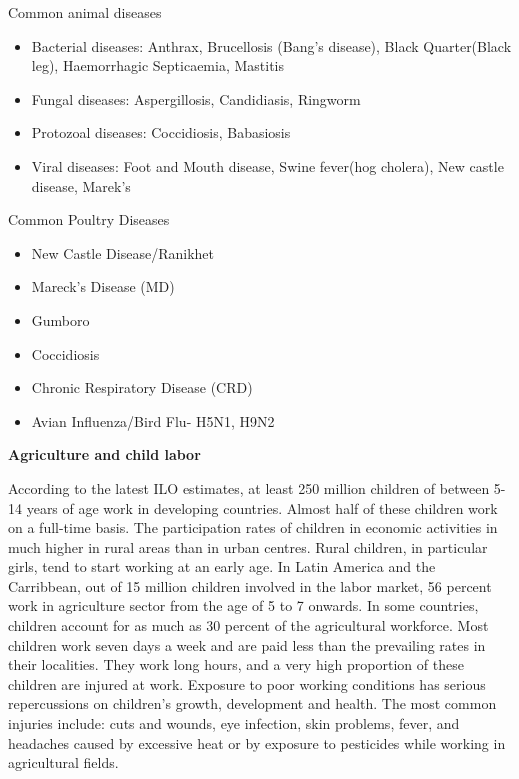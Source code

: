 \documentclass[
  openany]{book}
\providecommand{\tightlist}{%
  \setlength{\itemsep}{0pt}\setlength{\parskip}{0pt}}
\begin{document}
Common animal diseases

\begin{itemize}
\tightlist
\item
  Bacterial diseases: Anthrax, Brucellosis (Bang's disease), Black Quarter(Black leg), Haemorrhagic Septicaemia, Mastitis
\item
  Fungal diseases: Aspergillosis, Candidiasis, Ringworm
\item
  Protozoal diseases: Coccidiosis, Babasiosis
\item
  Viral diseases: Foot and Mouth disease, Swine fever(hog cholera), New castle disease, Marek's
\end{itemize}

Common Poultry Diseases

\begin{itemize}
\tightlist
\item
  New Castle Disease/Ranikhet
\item
  Mareck's Disease (MD)
\item
  Gumboro
\item
  Coccidiosis
\item
  Chronic Respiratory Disease (CRD)
\item
  Avian Influenza/Bird Flu- H5N1, H9N2
\end{itemize}

\textbf{Agriculture and child labor}

According to the latest ILO estimates, at least 250 million children of between 5-14 years of age work in developing countries. Almost half of these children work on a full-time basis. The participation rates of children in economic activities in much higher in rural areas than in urban centres. Rural children, in particular girls, tend to start working at an early age. In Latin America and the Carribbean, out of 15 million children involved in the labor market, 56 percent work in agriculture sector from the age of 5 to 7 onwards. In some countries, children account for as much as 30 percent of the agricultural workforce. Most children work seven days a week and are paid less than the prevailing rates in their localities. They work long hours, and a very high proportion of these children are injured at work. Exposure to poor working conditions has serious repercussions on children's growth, development and health. The most common injuries include: cuts and wounds, eye infection, skin problems, fever, and headaches caused by excessive heat or by exposure to pesticides while working in agricultural fields.
\end{document}
